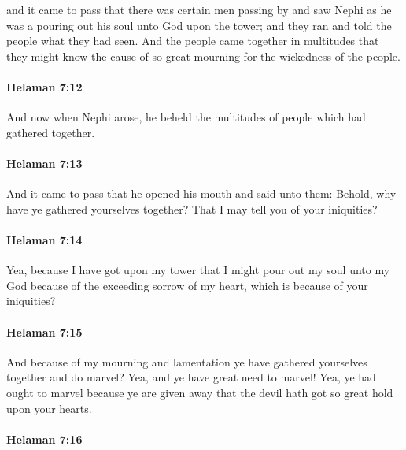 			and it came to pass that there was certain men passing by
			and saw Nephi as he was a pouring out his soul unto God upon the tower;
			and they ran and told the people what they had seen.
			And the people came together in multitudes
			that they might know the cause of so great mourning
			for the wickedness of the people.

		\paragraph{Helaman 7:12} %
			\label{HELAMAN-7-12}

			And now when Nephi arose,
			he beheld the multitudes of people which had gathered together.

		\paragraph{Helaman 7:13} %
			\label{HELAMAN-7-13}

			And it came to pass that he opened his mouth and said unto them:
			Behold, why have ye gathered yourselves together?
			That I may tell you of your iniquities?

		\paragraph{Helaman 7:14} %
			\label{HELAMAN-7-14}

			Yea, because I have got upon my tower
			that I might pour out my soul unto my God
			because of the exceeding sorrow of my heart,
			which is because of your iniquities?

		\paragraph{Helaman 7:15} %
			\label{HELAMAN-7-15}

			And because of my mourning and lamentation
			ye have gathered yourselves together and do marvel?
			Yea, and ye have great need to marvel!
			Yea, ye had ought to marvel because ye are given away
			that the devil hath got so great hold upon your hearts.

		\paragraph{Helaman 7:16} %
			\label{HELAMAN-7-16}

